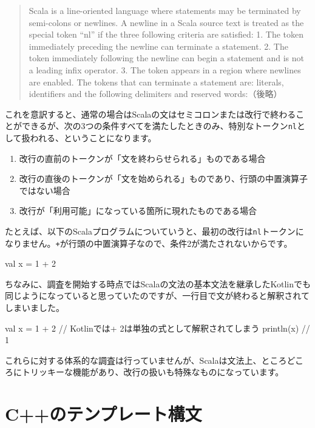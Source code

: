 \begin{quote}
Scala is a line-oriented language where statements may be terminated by
semi-colons or newlines. A newline in a Scala source text is treated as
the special token ``nl'' if the three following criteria are satisfied:
1. The token immediately preceding the newline can terminate a
statement. 2. The token immediately following the newline can begin a
statement and is not a leading infix operator. 3. The token appears in a region where newlines are enabled.
The tokens that can terminate a statement are: literals, identifiers and
the following delimiters and reserved words:（後略）
\end{quote}

これを意訳すると、通常の場合はScalaの文はセミコロンまたは改行で終わることができるが、次の3つの条件すべてを満たしたときのみ、特別なトークン\texttt{nl}として扱われる、ということになります。

\begin{enumerate}
\item
  改行の直前のトークンが「文を終わらせられる」ものである場合
\item
  改行の直後のトークンが「文を始められる」ものであり、行頭の中置演算子ではない場合
\item
  改行が「利用可能」になっている箇所に現れたものである場合
\end{enumerate}

たとえば、以下のScalaプログラムについていうと、最初の改行は\texttt{nl}トークンになりません。\texttt{+}が行頭の中置演算子なので、条件2が満たされないからです。

\begin{codescreen}{}
val x = 1
      + 2
\end{codescreen}

ちなみに、調査を開始する時点ではScalaの文法の基本文法を継承したKotlinでも同じようになっていると思っていたのですが、一行目で文が終わると解釈されてしまいました。

\begin{codescreen}{}
val x = 1
      + 2 // Kotlinでは+ 2は単独の式として解釈されてしまう
println(x) // 1
\end{codescreen}

これらに対する体系的な調査は行っていませんが、Scalaは文法上、ところどころにトリッキーな機能があり、改行の扱いも特殊なものになっています。

\section{C++のテンプレート構文}

